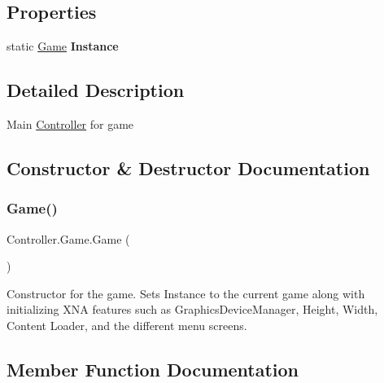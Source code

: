 \subsection*{Properties}
\begin{DoxyCompactItemize}
\item 
\hypertarget{class_controller_1_1_game_a53f51c3ad8d59f44f8ab6aee59c0fbec}{}\label{class_controller_1_1_game_a53f51c3ad8d59f44f8ab6aee59c0fbec} 
static \hyperlink{class_controller_1_1_game}{Game} {\bfseries Instance}
\end{DoxyCompactItemize}


\subsection{Detailed Description}
Main \hyperlink{namespace_controller}{Controller} for game 



\subsection{Constructor \& Destructor Documentation}
\hypertarget{class_controller_1_1_game_a93f1824d202daf7132b24039b97eaa7a}{}\label{class_controller_1_1_game_a93f1824d202daf7132b24039b97eaa7a} 
\subsubsection{\texorpdfstring{Game()}{Game()}}
{\footnotesize\ttfamily Controller.\+Game.\+Game (\begin{DoxyParamCaption}{ }\end{DoxyParamCaption})\hspace{0.3cm}{\ttfamily [inline]}}

Constructor for the game. Sets Instance to the current game along with initializing X\+NA features such as Graphics\+Device\+Manager, Height, Width, Content Loader, and the different menu screens. 

\subsection{Member Function Documentation}
\hypertarget{class_controller_1_1_game_a243addf184836c81e6a4f793b0ba0a9f}{}\label{class_controller_1_1_game_a243addf184836c81e6a4f793b0ba0a9f} 
